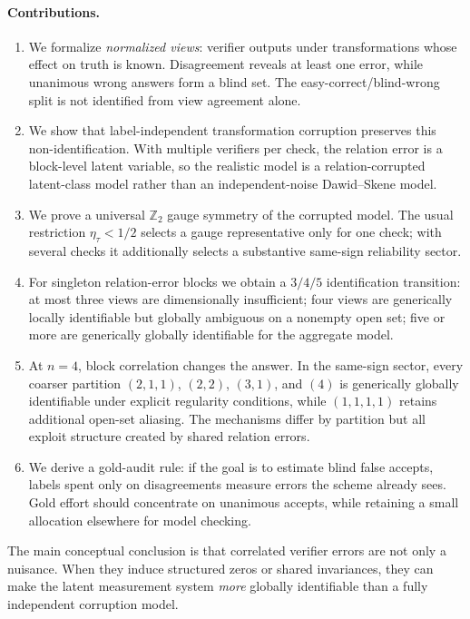 \documentclass[11pt]{article}
\theoremstyle{definition}
\theoremstyle{remark}
\newcommand{\Ztwo}{\mathbb{Z}_2}
\begin{document}
\paragraph{Contributions.}
\begin{enumerate}
\item We formalize \emph{normalized views}: verifier outputs under transformations whose effect on truth is known. Disagreement reveals at least one error, while unanimous wrong answers form a blind set. The easy-correct/blind-wrong split is not identified from view agreement alone.
\item We show that label-independent transformation corruption preserves this non-identification. With multiple verifiers per check, the relation error is a block-level latent variable, so the realistic model is a relation-corrupted latent-class model rather than an independent-noise Dawid--Skene model.
\item We prove a universal $\Ztwo$ gauge symmetry of the corrupted model. The usual restriction $\eta_\tau<1/2$ selects a gauge representative only for one check; with several checks it additionally selects a substantive same-sign reliability sector.
\item For singleton relation-error blocks we obtain a $3/4/5$ identification transition: at most three views are dimensionally insufficient; four views are generically locally identifiable but globally ambiguous on a nonempty open set; five or more are generically globally identifiable for the aggregate model.
\item At $n=4$, block correlation changes the answer. In the same-sign sector, every coarser partition $(2,1,1)$, $(2,2)$, $(3,1)$, and $(4)$ is generically globally identifiable under explicit regularity conditions, while $(1,1,1,1)$ retains additional open-set aliasing. The mechanisms differ by partition but all exploit structure created by shared relation errors.
\item We derive a gold-audit rule: if the goal is to estimate blind false accepts, labels spent only on disagreements measure errors the scheme already sees. Gold effort should concentrate on unanimous accepts, while retaining a small allocation elsewhere for model checking.
\end{enumerate}

The main conceptual conclusion is that correlated verifier errors are not only a nuisance. When they induce structured zeros or shared invariances, they can make the latent measurement system \emph{more} globally identifiable than a fully independent corruption model.
\end{document}
